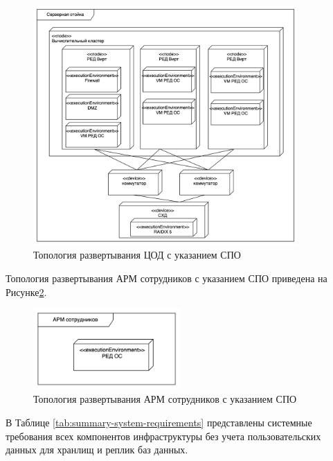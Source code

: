 \documentclass[14pt, a4paper]{extarticle}
\begin{document}
\begin{figure}[H]
  \centering
  \includegraphics[width=0.9\textwidth]{deployment_server.png}
  \caption{Топология развертывания ЦОД с указанием СПО}
  \label{fig:deployment_server}
\end{figure}

Топология развертывания АРМ сотрудников с указанием СПО приведена на Рисунке\;\ref{fig:deployment_arm}.

\begin{figure}[H]
  \centering
  \includegraphics[width=0.5\textwidth]{deployment_arm.png}
  \caption{Топология развертывания АРМ сотрудников с указанием СПО}
  \label{fig:deployment_arm}
\end{figure}


В Таблице \;\ref{tab:summary-system-requirements} представлены системные требования всех компонентов
инфраструктуры без учета пользовательских данных для хранлищ и реплик баз данных.
\end{document}
